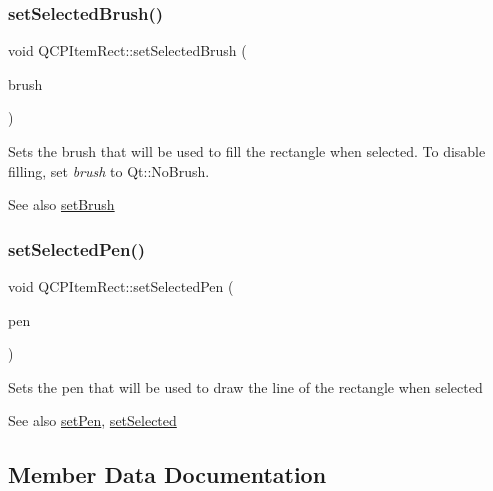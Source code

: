 \subsubsection{\texorpdfstring{setSelectedBrush()}{setSelectedBrush()}}
{\footnotesize\ttfamily void Q\+C\+P\+Item\+Rect\+::set\+Selected\+Brush (\begin{DoxyParamCaption}\item[{const Q\+Brush \&}]{brush }\end{DoxyParamCaption})}

Sets the brush that will be used to fill the rectangle when selected. To disable filling, set {\itshape brush} to Qt\+::\+No\+Brush.

\begin{DoxySeeAlso}{See also}
\mbox{\hyperlink{class_q_c_p_item_rect_abbd4e346a03513ee466afc25d9c75446}{set\+Brush}} 
\end{DoxySeeAlso}
\mbox{\label{class_q_c_p_item_rect_a52a1bcb2dc753a538e406a2ba3cf21ce}} 
\subsubsection{\texorpdfstring{setSelectedPen()}{setSelectedPen()}}
{\footnotesize\ttfamily void Q\+C\+P\+Item\+Rect\+::set\+Selected\+Pen (\begin{DoxyParamCaption}\item[{const Q\+Pen \&}]{pen }\end{DoxyParamCaption})}

Sets the pen that will be used to draw the line of the rectangle when selected

\begin{DoxySeeAlso}{See also}
\mbox{\hyperlink{class_q_c_p_item_rect_a483c0da5a17e1646cd17ddea2c124e7d}{set\+Pen}}, \mbox{\hyperlink{class_q_c_p_abstract_item_a203de94ad586cc44d16c9565f49d3378}{set\+Selected}} 
\end{DoxySeeAlso}


\subsection{Member Data Documentation}
\mbox{\label{class_q_c_p_item_rect_a99313bf2b338d9f81e19bd38082038aa}} 
